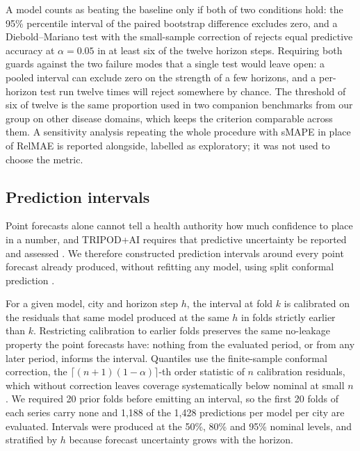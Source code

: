 \documentclass[11pt]{article}
\begin{document}
A model counts as beating the baseline only if both of two conditions hold: the 95\%
percentile interval of the paired bootstrap difference excludes zero, and a
Diebold--Mariano test \citep{Diebold1995} with the small-sample correction of
\citet{Harvey1997} rejects equal predictive accuracy at $\alpha = 0.05$ in at least six of
the twelve horizon steps. Requiring both guards against the two failure modes that a
single test would leave open: a pooled interval can exclude zero on the strength of a few
horizons, and a per-horizon test run twelve times will reject somewhere by chance. The
threshold of six of twelve is the same proportion used in two companion benchmarks from
our group on other disease domains, which keeps the criterion comparable across them. A
sensitivity analysis repeating the whole procedure with sMAPE in place of RelMAE is
reported alongside, labelled as exploratory; it was not used to choose the metric.

\subsection{Prediction intervals}

Point forecasts alone cannot tell a health authority how much confidence to place in a
number, and TRIPOD+AI requires that predictive uncertainty be reported and assessed
\citep{Collins2024tripod}. We therefore constructed prediction intervals around every
point forecast already produced, without refitting any model, using split conformal
prediction \citep{Angelopoulos2021conformal}.

For a given model, city and horizon step $h$, the interval at fold $k$ is calibrated on
the residuals that same model produced at the same $h$ in folds strictly earlier than
$k$. Restricting calibration to earlier folds preserves the same no-leakage property the
point forecasts have: nothing from the evaluated period, or from any later period,
informs the interval. Quantiles use the finite-sample conformal correction, the
$\lceil (n+1)(1-\alpha) \rceil$-th order statistic of $n$ calibration residuals, which
without correction leaves coverage systematically below nominal at small $n$. We required
20 prior folds before emitting an interval, so the first 20 folds of each series carry
none and 1{,}188 of the 1{,}428 predictions per model per city are evaluated. Intervals
were produced at the 50\%, 80\% and 95\% nominal levels, and stratified by $h$ because
forecast uncertainty grows with the horizon.
\end{document}
